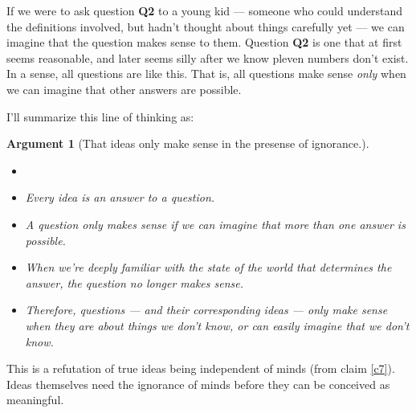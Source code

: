 \documentclass[11pt, oneside]{article}   	%
\newtheorem{argt}{Argument}
\begin{document}
If we were to ask question {\bf Q2}
to a young kid --- someone who could understand the
definitions involved, but hadn't thought about things carefully yet --- we can
imagine that the question makes sense to them. Question {\bf Q2} is one that
at first seems reasonable, and later seems silly after we know pleven numbers
don't exist. In a sense, all questions are like this. That is, all questions
make sense {\em only} when we can imagine that other answers are possible.
\fi

I'll summarize this line of thinking as:
\begin{argt}[That ideas only make sense in the presense of ignorance.]
    \label{a3}
    \normalfont
    \begin{itemize}
        \item[]
        \item Every idea is an answer to a question.
        \item A question only makes sense if we can imagine that more than one
            answer is possible.
        \item When we're deeply familiar with the state of the world that
            determines the answer, the question no longer makes sense.
        \item Therefore, questions --- and their corresponding ideas --- only
            make sense when they are about things we don't know, or can easily
            imagine that we don't know.
    \end{itemize}
\end{argt}
This is a refutation of true ideas being independent of minds (from
claim \ref{c7}). Ideas themselves need the ignorance of minds before they can be
conceived as meaningful.

\end{document}
